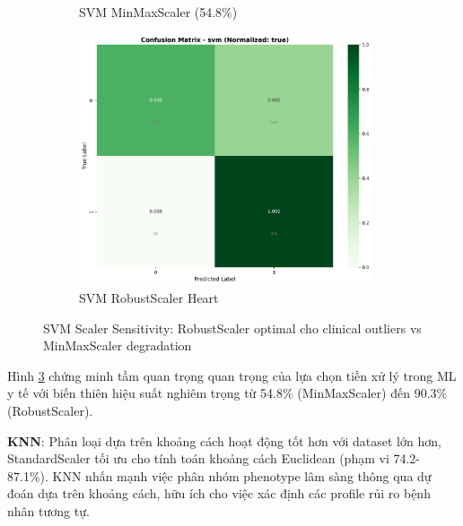 \begin{figure}[H]
\begin{subfigure}[b]{0.31\textwidth}
\caption{SVM MinMaxScaler (54.8\%)}
\label{fig:svm_minmax_degraded}
\end{subfigure}
\hfill
\begin{subfigure}[b]{0.31\textwidth}
\centering
\includegraphics[width=0.95\textwidth]{Result/heart_dataset/confusion_matrices/svm_numeric_dataset_RobustScaler.png}
\caption{SVM RobustScaler Heart}
\label{fig:svm_heart_performance}
\end{subfigure}
\caption{SVM Scaler Sensitivity: RobustScaler optimal cho clinical outliers vs MinMaxScaler degradation}
\label{fig:svm_scaler_comparison}
\end{figure}

Hình \ref{fig:svm_scaler_comparison} chứng minh tầm quan trọng quan trọng của lựa chọn tiền xử lý trong ML y tế với biến thiên hiệu suất nghiêm trọng từ 54.8\% (MinMaxScaler) đến 90.3\% (RobustScaler).

\textbf{KNN}: Phân loại dựa trên khoảng cách hoạt động tốt hơn với dataset lớn hơn, StandardScaler tối ưu cho tính toán khoảng cách Euclidean (phạm vi 74.2-87.1\%). KNN nhấn mạnh việc phân nhóm phenotype lâm sàng thông qua dự đoán dựa trên khoảng cách, hữu ích cho việc xác định các profile rủi ro bệnh nhân tương tự.

